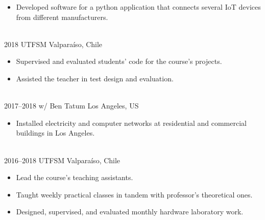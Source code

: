 \documentclass[a4paper]{cv-style}
\begin{document}
\begin{entrylist}
{\begin{itemize}
                    Built a python API to connect input from an electroencephalography scanner to that of an eye movement sensor.
                \item
                    Developed software for a python application that connects several IoT devices from different manufacturers.
            \end{itemize}} \\
        \entry
            {2018}
            {UTFSM}
            {Valpara\'iso, Chile}
            {
            \begin{itemize}
                \item
                    Supervised and evaluated students' code for the course's projects.
                \item
                    Assisted the teacher in test design and evaluation.
            \end{itemize}} \\
        \entry
            {2017--2018}
            {w/ Ben Tatum}
            {Los Angeles, US}
            {
            \begin{itemize}
                \item
                    Installed electricity and computer networks at residential and commercial buildings in Los Angeles.
            \end{itemize}} \\
        \entry
            {2016--2018}
            {UTFSM}
            {Valpara\'iso, Chile}
            {
            \begin{itemize}
                \item
                    Lead the course's teaching assistants.
                \item
                    Taught weekly practical classes in tandem with professor's theoretical ones.
                \item
                    Designed, supervised, and evaluated monthly hardware laboratory work.
            \end{itemize}}
    \end{entrylist}

\end{document}
